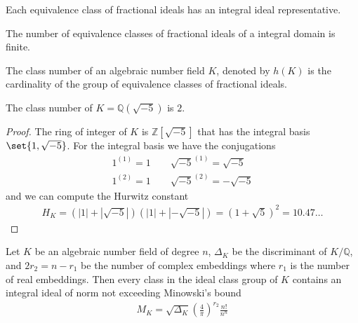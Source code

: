 \begin{thmbox}
    \begin{theorem}
        Each equivalence class of fractional ideals has an integral ideal representative.
    \end{theorem}
\end{thmbox}

\begin{thmbox}
    \begin{theorem}
        The number of equivalence classes of fractional ideals of a integral domain is finite.
    \end{theorem}
\end{thmbox}

\begin{defbox}
    \begin{definition}
        The class number of an algebraic number field \(K\), denoted by \(h(K)\) is the cardinality of the group of equivalence classes of fractional ideals.
    \end{definition}
\end{defbox}

\begin{example}
    The class number of \(K = \mathbb{Q}(\sqrt{-5})\) is \(2\).
\end{example}
\begin{proof}
    The ring of integer of \(K\) is \(\mathbb{Z}[\sqrt{-5}]\) that has the integral basis \(\set{1, \sqrt{-5}}\). For the integral basis we have the conjugations
    \begin{align*}
        1^{(1)} = 1 \qquad \sqrt{-5}^{(1)} = \sqrt{-5}\\
        1^{(2)} = 1 \qquad \sqrt{-5}^{(2)} = -\sqrt{-5}
    \end{align*}
    and we can compute the Hurwitz constant
    \begin{align*}
        H_K = \left(|1| + |\sqrt{-5}|\right) \left(|1| + |-\sqrt{-5}|\right) = (1 + \sqrt{5})^2 = 10.47\ldots
    \end{align*}
\end{proof}

\begin{thmbox}
    \begin{theorem}
        Let \(K\) be an algebraic number field of degree \(n\), \(\Delta_K\) be the discriminant of \(K / \mathbb{Q}\), and \(2 r_2 = n - r_1\) be the number of complex embeddings where \(r_1\) is the number of real embeddings. Then every class in the ideal class group of \(K\) contains an integral ideal of norm not exceeding Minowski's bound
        \begin{align*}
            M_K = \sqrt{\Delta_K} \left( \frac{4}{\pi} \right)^{r_2} \frac{n!}{n^n}
        \end{align*} 
    \end{theorem}
\end{thmbox}

